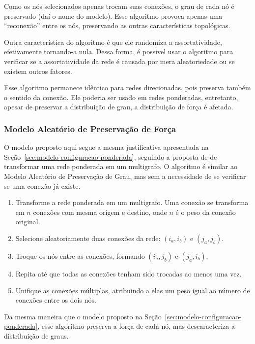 \documentclass[12pt,a4paper,final]{article}
\begin{document}
Como os nós selecionados apenas trocam suas conexões, o grau de cada nó é preservado (daí o nome do modelo). Esse algoritmo provoca apenas uma \enquote{reconexão} entre os nós, preservando as outras características topológicas.

Outra característica do algoritmo é que ele randomiza a assortatividade, efetivamente tornando-a nula. Dessa forma, é possível usar o algoritmo para verificar se a assortatividade da rede é causada por mera aleatoriedade ou se existem outros fatores.

Esse algoritmo permanece idêntico para redes direcionadas, pois preserva também o sentido da conexão. Ele poderia ser usado em redes ponderadas, entretanto, apesar de preservar a distribuição de grau, a distribuição de força é afetada.

\subsubsection{Modelo Aleatório de Preservação de Força}

O modelo proposto aqui segue a mesma justificativa apresentada na Seção~\ref{sec:modelo-configuracao-ponderada}, seguindo a proposta de \cite{Newman2004-by} de transformar uma rede ponderada em um multigrafo.
O algoritmo é similar ao Modelo Aleatório de Preservação de Grau, mas sem a necessidade de se verificar se uma conexão já existe.

\begin{enumerate}
\item Transforme a rede ponderada em um multigrafo. Uma conexão se transforma em $n$ conexões com mesma origem e destino, onde $n$ é o peso da conexão original.
\item Selecione aleatoriamente duas conexões da rede: $(i_a, i_b)$ e $(j_a, j_b)$.
\item Troque os nós entre as conexões, formando $(i_a, j_b)$ e $(j_a, i_b)$. 
\item Repita até que todas as conexões tenham sido trocadas ao menos uma vez.
\item Unifique as conexões múltiplas, atribuindo a elas um peso igual ao número de conexões entre os dois nós.
\end{enumerate}

Da mesma maneira que o modelo proposto na Seção~\ref{sec:modelo-configuracao-ponderada}, esse algoritmo preserva a força de cada nó, mas descaracteriza a distribuição de graus.
\end{document}
